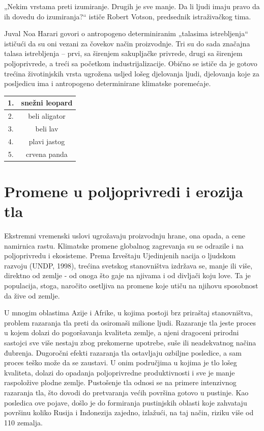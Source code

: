\documentclass[a4paper]{article}
\begin{document}
„Nekim vrstama preti izumiranje. Drugih je sve manje. Da li ljudi imaju pravo da ih dovedu do izumiranja?“ ističe Robert Votson, predsednik istraživačkog tima.

Juval Noa Harari govori o antropogeno determiniranim „talasima istrebljenja“ ističući da su oni vezani za čovekov način proizvodnje. Tri su do sada značajna talasa istrebljenja – prvi, sa širenjem sakupljačke privrede, drugi sa širenjem poljoprivrede, a treći sa početkom industrijalizacije. Obično se ističe da je gotovo trećina životinjskih vrsta ugrožena usljed lošeg djelovanja ljudi, djelovanja koje za posljedicu ima i antropogeno determinirane klimatske poremećaje.

\begin{center}
\begin{tabular}{||c c||} 
 \hline
 1. & snežni leopard \\ 
 \hline
 2. & beli aligator \\ 
 \hline
 3. & beli lav \\
 \hline
 4. & plavi jastog \\
 \hline
 5. & crvena panda \\ 
 \hline
\end{tabular}
\end{center}

\section{Promene u poljoprivredi i erozija tla}
\label{sec:promene_u_poljoprivredi_i_erozija_tla}
Ekstremni vremenski uslovi ugrožavaju proizvodnju hrane, ona opada, a cene namirnica rastu. Klimatske promene globalnog zagrevanja
su se odrazile i na poljoprivredu i ekosisteme. Prema Izveštaju Ujedinjenih nacija o ljudskom razvoju (UNDP, 1998), trećina svetskog stanovništva izdržava se, manje ili više, direktno od zemlje - od onoga što gaje na njivama i od divljači koju love. Ta je populacija, stoga, naročito osetljiva na promene koje utiču na njihovu sposobnost da žive od zemlje.

U mnogim oblastima Azije i Afrike, u kojima postoji brz priraštaj stanovništva, problem razaranja tla preti da osiromaši milione ljudi. Razaranje tla jeste proces u kojem dolazi do pogoršavanja kvaliteta zemlje, a njeni dragoceni prirodni sastojci sve više nestaju zbog prekomerne upotrebe, suše ili neadekvatnog načina đubrenja. Dugoročni efekti razaranja tla ostavljaju ozbiljne posledice, a sam proces teško može da se zaustavi. U onim područjima u kojima je tlo lošeg kvaliteta, dolazi do opadanja poljoprivredne produktivnosti i sve je manje raspoložive plodne zemlje.
Pustošenje tla odnosi se na primere intenzivnog razaranja tla, što dovodi do pretvaranja većih površina gotovo u pustinje. Kao posledica ove pojave, došlo je do formiranja pustinjskih oblasti koje zahvataju površinu koliko Rusija i Indonezija zajedno, izlažući, na taj način, riziku više od 110 zemalja.
\end{document}
